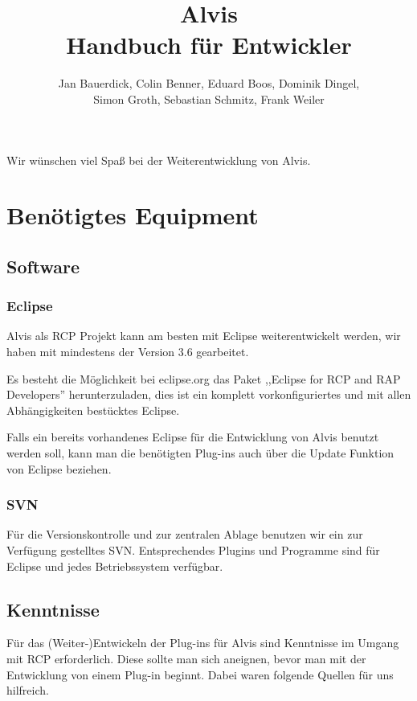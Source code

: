 \documentclass[10pt,a4paper,oneside]{scrbook}
\author{Jan Bauerdick,
Colin Benner,
Eduard Boos,
Dominik Dingel,\\
Simon Groth,
Sebastian Schmitz, 
Frank Weiler}
\title{Alvis\\Handbuch für Entwickler}
\begin{document}
\maketitle
\newpage
\tableofcontents
\newpage
Wir wünschen viel Spaß bei der Weiterentwicklung von Alvis.
\chapter{Benötigtes Equipment}
\section{Software}
\subsection{Eclipse}
Alvis als RCP Projekt kann am besten mit Eclipse weiterentwickelt werden, wir haben mit mindestens der Version 3.6 gearbeitet.

Es besteht die Möglichkeit bei eclipse.org das Paket ,,Eclipse for RCP and RAP Developers'' herunterzuladen, dies ist ein komplett vorkonfiguriertes und mit allen Abhängigkeiten bestücktes Eclipse.

Falls ein bereits vorhandenes Eclipse für die Entwicklung von Alvis benutzt werden soll, kann man die benötigten Plug-ins auch über die Update Funktion von Eclipse beziehen.

\subsection{SVN}
Für die Versionskontrolle und zur zentralen Ablage benutzen wir ein zur Verfügung gestelltes SVN. Entsprechendes Plugins und Programme sind für Eclipse und jedes Betriebssystem verfügbar. 

\section{Kenntnisse}
Für das (Weiter-)Entwickeln der Plug-ins für Alvis sind Kenntnisse im Umgang mit RCP erforderlich. Diese sollte man sich aneignen, bevor man mit der Entwicklung von einem Plug-in beginnt. Dabei waren folgende Quellen für uns hilfreich.
\end{document}
